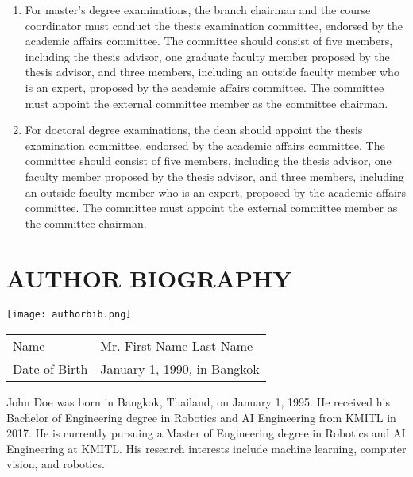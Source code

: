 \begin{enumerate}
\begin{enumerate}
        \item For master's degree examinations, the branch chairman and the course coordinator must conduct the thesis examination committee, endorsed by the academic affairs committee. The committee should consist of five members, including the thesis advisor, one graduate faculty member proposed by the thesis advisor, and three members, including an outside faculty member who is an expert, proposed by the academic affairs committee. The committee must appoint the external committee member as the committee chairman.
        
        \item For doctoral degree examinations, the dean should appoint the thesis examination committee, endorsed by the academic affairs committee. The committee should consist of five members, including the thesis advisor, one faculty member proposed by the thesis advisor, and three members, including an outside faculty member who is an expert, proposed by the academic affairs committee. The committee must appoint the external committee member as the committee chairman.
    \end{enumerate}
\end{enumerate}

\clearpage
\chapter*{AUTHOR BIOGRAPHY}

\vspace{1em}
\begin{center}
    \texttt{[image: authorbib.png]}
\end{center}

\vspace{1em}
\begin{flushleft}
\begin{tabular}{@{}l l}
Name & Mr. First Name Last Name \\
Date of Birth & January 1, 1990, in Bangkok
\end{tabular}
\end{flushleft}

\vspace{1em}
\noindent
John Doe was born in Bangkok, Thailand, on January 1, 1995. He received his Bachelor of Engineering degree in Robotics and AI Engineering from KMITL in 2017. He is currently pursuing a Master of Engineering degree in Robotics and AI Engineering at KMITL. His research interests include machine learning, computer vision, and robotics.

\clearpage